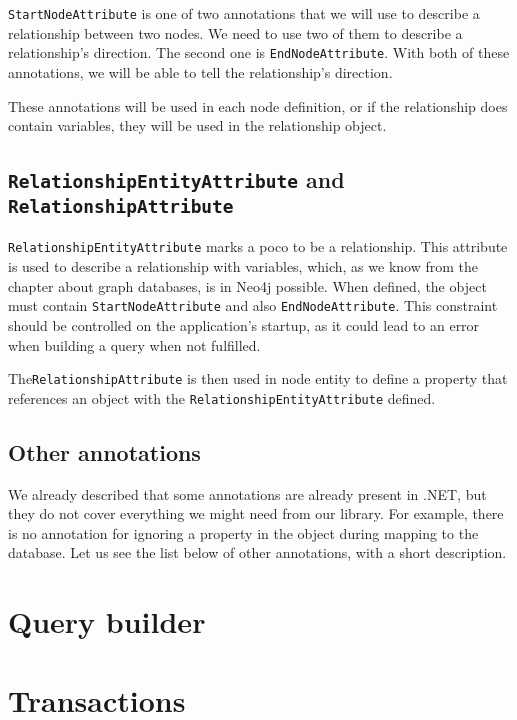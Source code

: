 \texttt{StartNodeAttribute} is one of two annotations that we will use to describe a relationship between two nodes. We need to use two of them to describe a
relationship's direction. The second one is \texttt{EndNodeAttribute}. With both of these annotations, we will be able to tell the relationship's direction.

These annotations will be used in each node definition, or if the relationship does contain variables, they will be used in the relationship object.

\subsection{\texttt{RelationshipEntityAttribute} and \texttt{RelationshipAttribute}}

\texttt{RelationshipEntityAttribute} marks a \acrshort{poco} to be a relationship. This attribute is used to describe a
relationship with variables, which, as we know from the chapter about graph databases, is in Neo4j possible. When defined,
the object must contain \texttt{StartNodeAttribute} and also \texttt{EndNodeAttribute}. This constraint should be controlled on
the application's startup, as it could lead to an error when building a query when not fulfilled.

The\texttt{RelationshipAttribute} is then used in node entity to define a property that references an object with the \texttt{RelationshipEntityAttribute} defined.

\subsection{Other annotations}

We already described that some annotations are already present in .NET, but they do not cover everything we might need from our library.
For example, there is no annotation for ignoring a property in the object during mapping to the database. Let us see the list below of other annotations, with a short description.


\section{Query builder}

\section{Transactions}
